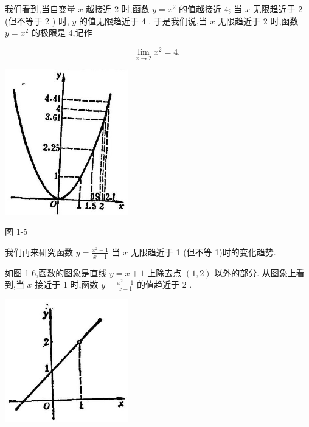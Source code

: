 \documentclass[10pt]{article}
\begin{document}
\begin{center}
\end{center}

我们看到,当自变量 \(x\) 越接近 2 时,函数 \(y = {x}^{2}\) 的值越接近 4; 当 \(x\) 无限趋近于 2 (但不等于 2 ) 时, \(y\) 的值无限趋近于 4 . 于是我们说,当 \(x\) 无限趋近于 2 时,函数 \(y = {x}^{2}\) 的极限是 4,记作

\[
\mathop{\lim }\limits_{{x \rightarrow 2}}{x}^{2} = 4\text{. }
\]

\begin{center}
\includegraphics[max width=0.4\textwidth]{images/01912c18-5c3f-733d-b775-749ba9897a9d_23_174405.jpg}
\end{center}

图 1-5

我们再来研究函数 \(y = \frac{{x}^{2} - 1}{x - 1}\) 当 \(x\) 无限趋近于 1 (但不等 1)时的变化趋势.

如图 1-6,函数的图象是直线 \(y = x + 1\) 上除去点 \(\left( {1,2}\right)\) 以外的部分. 从图象上看到,当 \(x\) 接近于 1 时,函数 \(y = \frac{{x}^{2} - 1}{x - 1}\) 的值趋近于 2 .

\begin{center}
\includegraphics[max width=0.4\textwidth]{images/01912c18-5c3f-733d-b775-749ba9897a9d_24_728399.jpg}
\end{center}
\end{document}

